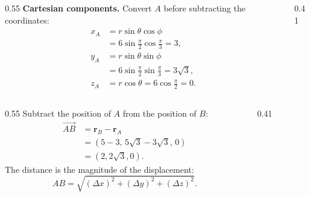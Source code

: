 \begin{solutionframe}
  \begin{columns}[T,onlytextwidth]
    \begin{column}{0.55\textwidth}
      \textbf{Cartesian components.}
      Convert $A$ before subtracting the coordinates:
      \[
        \begin{aligned}
          x_A&=r\sin\theta\cos\phi\\
             &=6\sin\frac{\pi}{2}\cos\frac{\pi}{3}=3,\\[0.3em]
          y_A&=r\sin\theta\sin\phi\\
             &=6\sin\frac{\pi}{2}\sin\frac{\pi}{3}=3\sqrt3,\\[0.3em]
          z_A&=r\cos\theta=6\cos\frac{\pi}{2}=0.
        \end{aligned}
      \]
    \end{column}
    \begin{column}{0.41\textwidth}
      \centering
      \resizebox{!}{0.44\paperheight}{}
    \end{column}
  \end{columns}
\end{solutionframe}

\begin{solutionframe}
  \begin{columns}[T,onlytextwidth]
    \begin{column}{0.55\textwidth}
      Subtract the position of $A$ from the position of $B$:
      \[
        \begin{aligned}
          \overrightarrow{AB}&=\mathbf r_B-\mathbf r_A\\
            &=(5-3,\,5\sqrt3-3\sqrt3,\,0)\\
            &=(2,2\sqrt3,0).
        \end{aligned}
      \]
      The distance is the magnitude of the displacement:
      \[
        AB=\sqrt{(\Delta x)^2+(\Delta y)^2+(\Delta z)^2}.
      \]
    \end{column}
    \begin{column}{0.41\textwidth}
      \centering
      \resizebox{!}{0.44\paperheight}{}
    \end{column}
  \end{columns}
\end{solutionframe}

